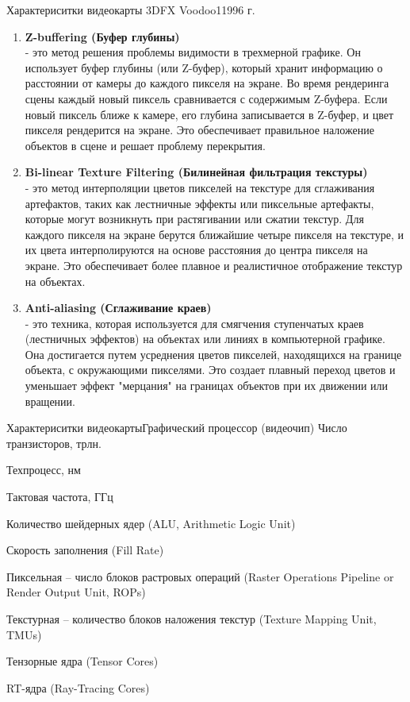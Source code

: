 \documentclass{beamer}
\begin{document}
\begin{frame}{Характериситки видеокарты 3DFX Voodoo1}{1996 г.}
{{\begin{enumerate}
	\item
	\textbf{Z-buffering (Буфер глубины)} \\
	- это метод решения проблемы видимости в трехмерной графике. Он использует буфер глубины (или Z-буфер), который хранит информацию о расстоянии от камеры до каждого пикселя на экране. Во время рендеринга сцены каждый новый пиксель сравнивается с содержимым Z-буфера. Если новый пиксель ближе к камере, его глубина записывается в Z-буфер, и цвет пикселя рендерится на экране. Это обеспечивает правильное наложение объектов в сцене и решает проблему перекрытия.
	
	\item
	\textbf{Bi-linear Texture Filtering (Билинейная фильтрация текстуры) } \\
	- это метод интерполяции цветов пикселей на текстуре для сглаживания артефактов, таких как лестничные эффекты или пиксельные артефакты, которые могут возникнуть при растягивании или сжатии текстур. Для каждого пикселя на экране берутся ближайшие четыре пикселя на текстуре, и их цвета интерполируются на основе расстояния до центра пикселя на экране. Это обеспечивает более плавное и реалистичное отображение текстур на объектах.
	\item
	\textbf{Anti-aliasing (Сглаживание краев)} \\
	- это техника, которая используется для смягчения ступенчатых краев (лестничных эффектов) на объектах или линиях в компьютерной графике. Она достигается путем усреднения цветов пикселей, находящихся на границе объекта, с окружающими пикселями. Это создает плавный переход цветов и уменьшает эффект "мерцания" на границах объектов при их движении или вращении.
\end{enumerate}
}
}
\end{frame}


\begin{frame}{Характериситки видеокарты}{Графический процессор (видеочип)}
	Число транзисторов, трлн.
	
	Техпроцесс, нм
	
	Тактовая частота, ГГц
	
	Количество шейдерных ядер (ALU, Arithmetic Logic Unit)
	
	Скорость заполнения (Fill Rate)
	
	Пиксельная – число блоков растровых операций (Raster Operations Pipeline
	or Render Output Unit, ROPs)
	
	Текстурная – количество блоков наложения текстур (Texture Mapping Unit,
	TMUs)
	
	Тензорные ядра (Tensor Cores)
	
	RT-ядра (Ray-Tracing Cores)
	
\end{frame}
\end{document}
